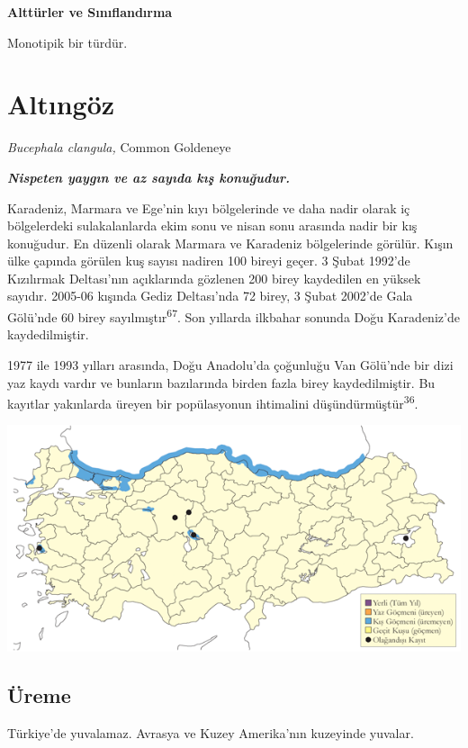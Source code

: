 \documentclass[
  letterpaper,
  DIV=11,
  numbers=noendperiod]{scrreprt}
\begin{document}
\textbf{Alttürler ve Sınıflandırma}

Monotipik bir türdür.

\hypertarget{altux131nguxf6z}{%
\section{Altıngöz}\label{altux131nguxf6z}}

\emph{Bucephala clangula,} Common Goldeneye

\textbf{\emph{Nispeten yaygın ve az sayıda kış konuğudur.}}

Karadeniz, Marmara ve Ege'nin kıyı bölgelerinde ve daha nadir olarak iç
bölgelerdeki sulakalanlarda ekim sonu ve nisan sonu arasında nadir bir
kış konuğudur. En düzenli olarak Marmara ve Karadeniz bölgelerinde
görülür. Kışın ülke çapında görülen kuş sayısı nadiren 100 bireyi geçer.
3 Şubat 1992'de Kızılırmak Deltası'nın açıklarında gözlenen 200 birey
kaydedilen en yüksek sayıdır. 2005-06 kışında Gediz Deltası'nda 72
birey, 3 Şubat 2002'de Gala Gölü'nde 60 birey
sayılmıştır\textsuperscript{67}. Son yıllarda ilkbahar sonunda Doğu
Karadeniz'de kaydedilmiştir.

1977 ile 1993 yılları arasında, Doğu Anadolu'da çoğunluğu Van Gölü'nde
bir dizi yaz kaydı vardır ve bunların bazılarında birden fazla birey
kaydedilmiştir. Bu kayıtlar yakınlarda üreyen bir popülasyonun
ihtimalini düşündürmüştür\textsuperscript{36}.

\includegraphics{images/harita_Page_031.png}

\hypertarget{uxfcreme-30}{%
\subsection{\texorpdfstring{\textbf{Üreme}}{Üreme}}\label{uxfcreme-30}}

Türkiye'de yuvalamaz. Avrasya ve Kuzey Amerika'nın kuzeyinde yuvalar.
\end{document}
